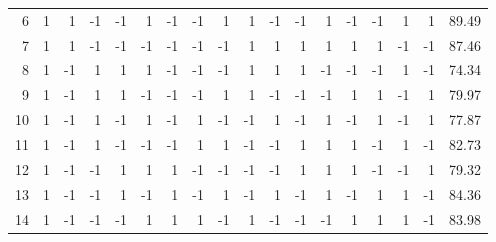 \documentclass{article}
\begin{document}
\begin{table}[!ht]
{\begin{tabular}{|r|r|r|r|r|r|r|r|r|r|r|r|r|r|r|r|r|r|}
            6         & 1                  & 1          & -1         & -1         & 1          & -1          & -1          & 1           & 1           & -1          & -1          & 1            & -1           & -1           & 1            & 1             & 89.49      \\
            7         & 1                  & 1          & -1         & -1         & -1         & -1          & -1          & -1          & 1           & 1           & 1           & 1            & 1            & 1            & -1           & -1            & 87.46      \\
            8         & 1                  & -1         & 1          & 1          & 1          & -1          & -1          & -1          & 1           & 1           & 1           & -1           & -1           & -1           & 1            & -1            & 74.34      \\
            9         & 1                  & -1         & 1          & 1          & -1         & -1          & -1          & 1           & 1           & -1          & -1          & -1           & 1            & 1            & -1           & 1             & 79.97      \\
            10        & 1                  & -1         & 1          & -1         & 1          & -1          & 1           & -1          & -1          & 1           & -1          & 1            & -1           & 1            & -1           & 1             & 77.87      \\
            11        & 1                  & -1         & 1          & -1         & -1         & -1          & 1           & 1           & -1          & -1          & 1           & 1            & 1            & -1           & 1            & -1            & 82.73      \\
            12        & 1                  & -1         & -1         & 1          & 1          & 1           & -1          & -1          & -1          & -1          & 1           & 1            & 1            & -1           & -1           & 1             & 79.32      \\
            13        & 1                  & -1         & -1         & 1          & -1         & 1           & -1          & 1           & -1          & 1           & -1          & 1            & -1           & 1            & 1            & -1            & 84.36      \\
            14        & 1                  & -1         & -1         & -1         & 1          & 1           & 1           & -1          & 1           & -1          & -1          & -1           & 1            & 1            & 1            & -1            & 83.98      \\

\end{tabular}}
\end{table}
\end{document}
